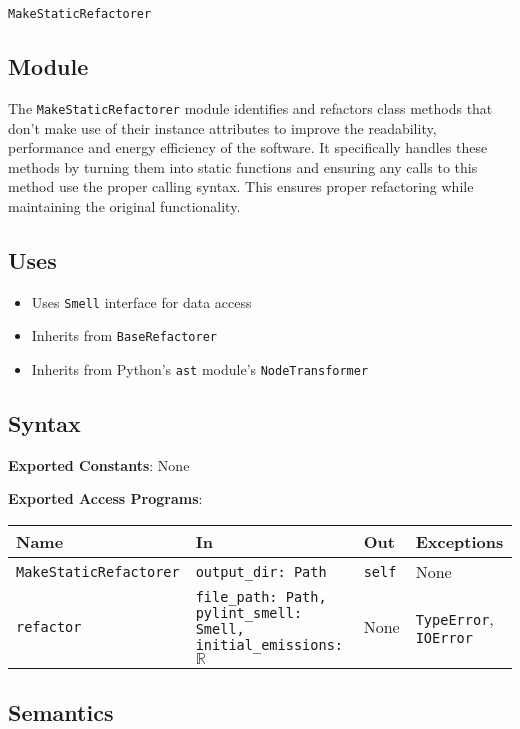 \documentclass[12pt, titlepage]{article}
\begin{document}
\texttt{MakeStaticRefactorer}

\subsection{Module}

The \texttt{MakeStaticRefactorer} module identifies and refactors 
class methods that don't make use of their instance attributes to improve the readability, performance and energy efficiency of the software. It specifically handles these methods by turning them into static functions and ensuring any calls to this method use the proper calling syntax. This ensures proper refactoring while maintaining the original functionality.

\subsection{Uses}
\begin{itemize}
  \item Uses \texttt{Smell} interface for data access
  \item Inherits from \texttt{BaseRefactorer}
  \item Inherits from Python's \texttt{ast} module's \texttt{NodeTransformer}
\end{itemize}
  
\subsection{Syntax}
\noindent
\textbf{Exported Constants}: None

\noindent
\textbf{Exported Access Programs}:
  
\begin{tabularx}{\linewidth}{|l|>{\raggedright\arraybackslash}X|l|l|}
  \hline
  \textbf{Name} & \textbf{In} & \textbf{Out} & \textbf{Exceptions} \\
  \hline
  \texttt{MakeStaticRefactorer} & \texttt{output\_dir: Path} & \texttt{self} & None \\
  \hline
  \texttt{refactor} & \texttt{file\_path: Path, pylint\_smell: Smell, initial\_emissions: $\mathbb{R}$} & None & \texttt{TypeError}, \texttt{IOError} \\
  \hline
\end{tabularx}
  
\subsection{Semantics}
  
\end{document}
